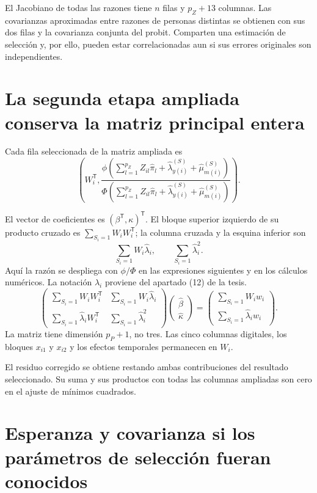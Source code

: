 \documentclass[11pt,a4paper]{article}
\begin{document}
El Jacobiano de todas las razones tiene $n$ filas y $p_Z+13$ columnas. Las covarianzas aproximadas entre razones de personas distintas se obtienen con sus dos filas y la covarianza conjunta del probit. Comparten una estimación de selección y, por ello, pueden estar correlacionadas aun si sus errores originales son independientes.

\clearpage
\section{La segunda etapa ampliada conserva la matriz principal entera}
Cada fila seleccionada de la matriz ampliada es
\[
\left(W_i^{\mathsf T}, \frac{\phi\!\left(\sum_{l=1}^{p_Z}Z_{il}\widehat\pi_l+\widehat\lambda_{y(i)}^{(S)}+\widehat\mu_{m(i)}^{(S)}\right)}{\Phi\!\left(\sum_{l=1}^{p_Z}Z_{il}\widehat\pi_l+\widehat\lambda_{y(i)}^{(S)}+\widehat\mu_{m(i)}^{(S)}\right)}\right).
\]

El vector de coeficientes es $(\beta^{\mathsf T},\kappa)^{\mathsf T}$. El bloque superior izquierdo de su producto cruzado es $\sum_{S_i=1}W_iW_i^{\mathsf T}$; la columna cruzada y la esquina inferior son
\[
\sum_{S_i=1}W_i\widehat\lambda_i,\qquad
\sum_{S_i=1}\widehat\lambda_i^2.
\]
Aquí la razón se despliega con $\phi/\Phi$ en las expresiones siguientes y en los cálculos numéricos. La notación $\widehat\lambda_i$ proviene del apartado (12) de la tesis.
\[
\begin{pmatrix}
\sum_{S_i=1}W_iW_i^{\mathsf T}&\sum_{S_i=1}W_i\widehat\lambda_i\\
\sum_{S_i=1}\widehat\lambda_iW_i^{\mathsf T}&\sum_{S_i=1}\widehat\lambda_i^2
\end{pmatrix}
\begin{pmatrix}\widehat\beta\\\widehat\kappa\end{pmatrix}
=
\begin{pmatrix}\sum_{S_i=1}W_iw_i\\\sum_{S_i=1}\widehat\lambda_iw_i\end{pmatrix}.
\]
La matriz tiene dimensión $p_P+1$, no tres. Las cinco columnas digitales, los bloques $x_{i1}$ y $x_{i2}$ y los efectos temporales permanecen en $W_i$.

El residuo corregido se obtiene restando ambas contribuciones del resultado seleccionado. Su suma y sus productos con todas las columnas ampliadas son cero en el ajuste de mínimos cuadrados.

\clearpage
\section{Esperanza y covarianza si los parámetros de selección fueran conocidos}
\end{document}
